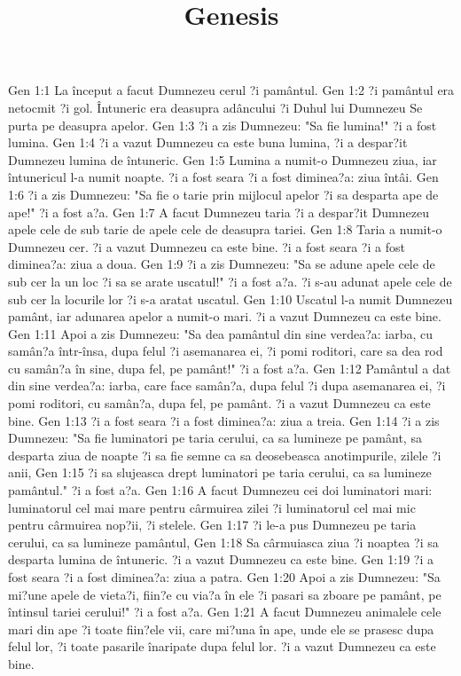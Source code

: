 

\title{Genesis}

Gen 1:1  La început a facut Dumnezeu cerul ?i pamântul.
Gen 1:2  ?i pamântul era netocmit ?i gol. Întuneric era deasupra adâncului ?i Duhul lui Dumnezeu Se purta pe deasupra apelor.
Gen 1:3  ?i a zis Dumnezeu: "Sa fie lumina!" ?i a fost lumina.
Gen 1:4  ?i a vazut Dumnezeu ca este buna lumina, ?i a despar?it Dumnezeu lumina de întuneric.
Gen 1:5  Lumina a numit-o Dumnezeu ziua, iar întunericul l-a numit noapte. ?i a fost seara ?i a fost diminea?a: ziua întâi.
Gen 1:6  ?i a zis Dumnezeu: "Sa fie o tarie prin mijlocul apelor ?i sa desparta ape de ape!" ?i a fost a?a.
Gen 1:7  A facut Dumnezeu taria ?i a despar?it Dumnezeu apele cele de sub tarie de apele cele de deasupra tariei.
Gen 1:8  Taria a numit-o Dumnezeu cer. ?i a vazut Dumnezeu ca este bine. ?i a fost seara ?i a fost diminea?a: ziua a doua.
Gen 1:9  ?i a zis Dumnezeu: "Sa se adune apele cele de sub cer la un loc ?i sa se arate uscatul!" ?i a fost a?a. ?i s-au adunat apele cele de sub cer la locurile lor ?i s-a aratat uscatul.
Gen 1:10  Uscatul l-a numit Dumnezeu pamânt, iar adunarea apelor a numit-o mari. ?i a vazut Dumnezeu ca este bine.
Gen 1:11  Apoi a zis Dumnezeu: "Sa dea pamântul din sine verdea?a: iarba, cu samân?a într-însa, dupa felul ?i asemanarea ei, ?i pomi roditori, care sa dea rod cu samân?a în sine, dupa fel, pe pamânt!" ?i a fost a?a.
Gen 1:12  Pamântul a dat din sine verdea?a: iarba, care face samân?a, dupa felul ?i dupa asemanarea ei, ?i pomi roditori, cu samân?a, dupa fel, pe pamânt. ?i a vazut Dumnezeu ca este bine.
Gen 1:13  ?i a fost seara ?i a fost diminea?a: ziua a treia.
Gen 1:14  ?i a zis Dumnezeu: "Sa fie luminatori pe taria cerului, ca sa lumineze pe pamânt, sa desparta ziua de noapte ?i sa fie semne ca sa deosebeasca anotimpurile, zilele ?i anii,
Gen 1:15  ?i sa slujeasca drept luminatori pe taria cerului, ca sa lumineze pamântul." ?i a fost a?a.
Gen 1:16  A facut Dumnezeu cei doi luminatori mari: luminatorul cel mai mare pentru cârmuirea zilei ?i luminatorul cel mai mic pentru cârmuirea nop?ii, ?i stelele.
Gen 1:17  ?i le-a pus Dumnezeu pe taria cerului, ca sa lumineze pamântul,
Gen 1:18  Sa cârmuiasca ziua ?i noaptea ?i sa desparta lumina de întuneric. ?i a vazut Dumnezeu ca este bine.
Gen 1:19  ?i a fost seara ?i a fost diminea?a: ziua a patra.
Gen 1:20  Apoi a zis Dumnezeu: "Sa mi?une apele de vieta?i, fiin?e cu via?a în ele ?i pasari sa zboare pe pamânt, pe întinsul tariei cerului!" ?i a fost a?a.
Gen 1:21  A facut Dumnezeu animalele cele mari din ape ?i toate fiin?ele vii, care mi?una în ape, unde ele se prasesc dupa felul lor, ?i toate pasarile înaripate dupa felul lor. ?i a vazut Dumnezeu ca este bine.
